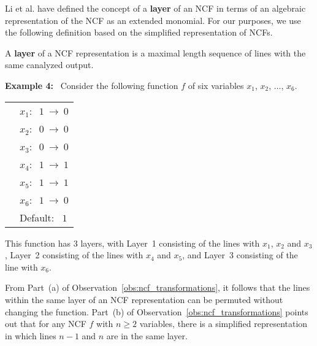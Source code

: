 \noindent
Li et al. \cite{Li-etal-2013} have defined the concept of a 
{\bf layer} of an NCF in terms of
an algebraic representation of the NCF as an extended monomial.
For our purposes, we use the following definition based on the
simplified representation of NCFs.

\begin{definition}
\label{def:layer}
A {\bf layer} of a NCF representation is a maximal length sequence 
of lines with the same canalyzed output.
\end{definition}

\noindent
\textbf{Example 4:}~ Consider the following function $f$ of six variables
$x_1$, $x_2$, $\ldots$, $x_6$. 

\bigskip

\noindent
\begin{tabular}{ll}
\hspace*{1.1in} & $x_1:~$  $1 ~\longrightarrow~ 0$ \\ [0.5ex]
\hspace*{1.1in} & $x_2:~$  $0 ~\longrightarrow~ 0$ \\ [0.5ex]
\hspace*{1.1in} & $x_3:~$  $0 ~\longrightarrow~ 0$ \\ [0.5ex]
\hspace*{1.1in} & $x_4:~$  $1 ~\longrightarrow~ 1$ \\ [0.5ex]
\hspace*{1.1in} & $x_5:~$  $1 ~\longrightarrow~ 1$ \\ [0.5ex]
\hspace*{1.1in} & $x_6:~$  $1 ~\longrightarrow~ 0$ \\ [0.5ex]
\hspace*{1.1in} & Default:~ $1$ \\
\end{tabular}

\medskip
\noindent
This function has 3 layers, with 
Layer~1 consisting of the lines with $x_1$, $x_2$ and $x_3$, 
Layer~2 consisting of the lines with $x_4$ and $x_5$, and
Layer~3 consisting of the line with $x_6$.  %

\medskip
From Part~(a) of Observation~\ref{obs:ncf_transformations},
it follows that the lines within the same layer of an NCF
representation can be permuted without changing the function.
Part~(b) of Observation~\ref{obs:ncf_transformations} points
out that for any NCF $f$ with $n \geq 2$ variables, there is a simplified 
representation in which lines $n-1$ and $n$ are in the same layer.

